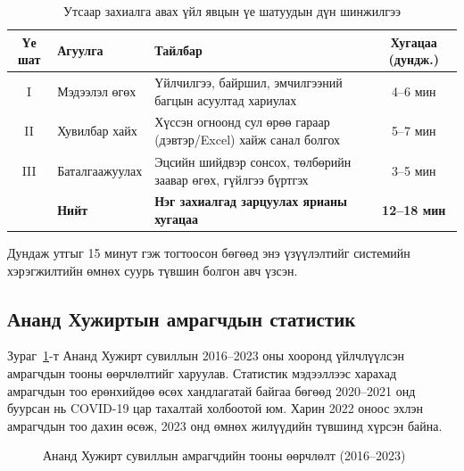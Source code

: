 \begin{table}[H]
  \centering
  \caption{Утсаар захиалга авах үйл явцын үе шатуудын дүн шинжилгээ}
  \label{tab:baseline-phases}
  \begin{tabular}{clp{5.5cm}c}
    \toprule
    \textbf{Үе шат} & \textbf{Агуулга} & \textbf{Тайлбар} & \textbf{Хугацаа (дундж.)} \\
    \midrule
    I   & Мэдээлэл өгөх   & Үйлчилгээ, байршил, эмчилгээний багцын асуултад хариулах           & 4--6 мин \\
    II  & Хувилбар хайх   & Хүссэн огноонд сул өрөө гараар (дэвтэр/Excel) хайж санал болгох   & 5--7 мин \\
    III & Баталгаажуулах  & Эцсийн шийдвэр сонсох, төлбөрийн заавар өгөх, гүйлгээ бүртгэх    & 3--5 мин \\
    \midrule
    & \textbf{Нийт} & \textbf{Нэг захиалгад зарцуулах ярианы хугацаа} & \textbf{12--18 мин} \\
    \bottomrule
  \end{tabular}
\end{table}

Дундаж утгыг 15 минут гэж тогтоосон бөгөөд энэ үзүүлэлтийг системийн хэрэгжилтийн өмнөх суурь түвшин болгон авч үзсэн.

\subsection{Ананд Хужиртын амрагчдын статистик}

Зураг~\ref{fig:customers-stats}-т Ананд Хужирт сувиллын 2016–2023 оны хооронд үйлчлүүлсэн амрагчдын тооны өөрчлөлтийг харуулав. Статистик мэдээллээс харахад амрагчдын тоо ерөнхийдөө өсөх хандлагатай байгаа бөгөөд 2020–2021 онд буурсан нь COVID-19 цар тахалтай холбоотой юм. Харин 2022 оноос эхлэн амрагчдын тоо дахин өсөж, 2023 онд өмнөх жилүүдийн түвшинд хүрсэн байна.

\begin{figure}[H]
  \centering
  \caption{Ананд Хужирт сувиллын амрагчдийн тооны өөрчлөлт (2016--2023)}
  \label{fig:customers-stats}
\end{figure}


